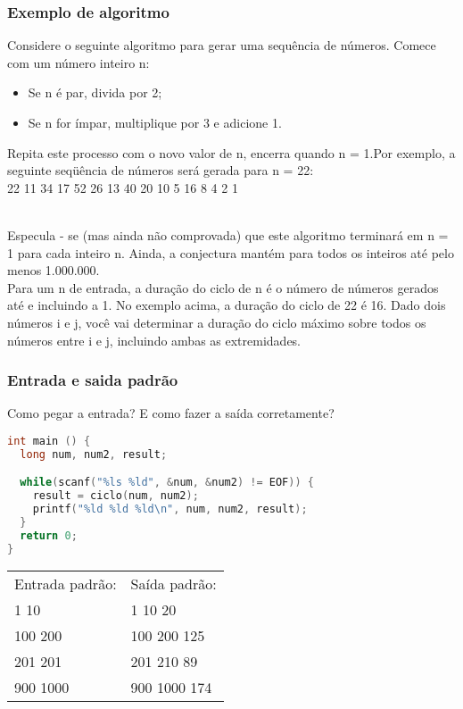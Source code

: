 \begin{frame}
  \frametitle{Exemplo de algoritmo}
	\label{exemple:sequencia}
  \footnotesize Considere o seguinte algoritmo para gerar uma sequência de números. Comece com um número inteiro n:
  \begin{itemize}
   \item \footnotesize Se n é par, divida por 2;
   \item \footnotesize Se n for ímpar, multiplique por 3 e adicione 1.
  \end{itemize}
  \footnotesize Repita este processo com o novo valor de n, encerra quando n = 1.Por exemplo, a seguinte seqüência de números será gerada para n = 22:\\
  \footnotesize 22 11 34 17 52 26 13 40 20 10 5 16 8 4 2 1\\
  
  \

  \footnotesize Especula - se (mas ainda não comprovada) que este algoritmo terminará em n = 1 para cada inteiro n. Ainda, a conjectura mantém para todos os inteiros até pelo menos 1.000.000.\\
  \footnotesize Para um n de entrada, a duração do ciclo de n é o número de números gerados até e incluindo a 1. No exemplo acima, a duração do ciclo de 22 é 16. Dado dois números i e j, você vai determinar a duração do ciclo máximo sobre todos os números entre i e j, incluindo ambas as extremidades.
\end{frame}

\begin{frame}[fragile]
  \frametitle{Entrada e saida padrão}
  Como pegar a entrada? E como fazer a saída corretamente?
  \begin{lstlisting}[language=c]
int main () {
  long num, num2, result;

  while(scanf("%ls %ld", &num, &num2) != EOF)) {
    result = ciclo(num, num2);
    printf("%ld %ld %ld\n", num, num2, result); 
  }
  return 0;
}
  \end{lstlisting}
  \begin{tabular}{ll}\\
    Entrada padrão: &Saída padrão:\\
    1 10 &1 10 20\\
    100 200 &100 200 125\\
    201 201 &201 210 89\\
    900 1000 &900 1000 174\\	
  \end{tabular}
\end{frame}
